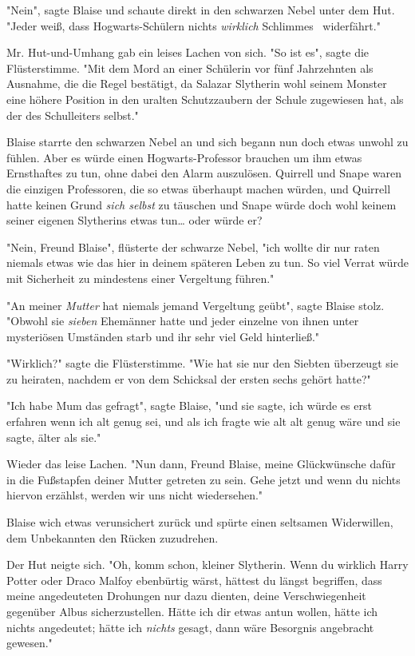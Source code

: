 {"Nein", sagte Blaise und schaute direkt in den schwarzen Nebel unter dem Hut. "Jeder weiß, dass Hogwarts-Schülern nichts \emph{wirklich} Schlimmes ~widerfährt."

Mr. Hut-und-Umhang gab ein leises Lachen von sich. "So ist es", sagte die Flüsterstimme. "Mit dem Mord an einer Schülerin vor fünf Jahrzehnten als Ausnahme, die die Regel bestätigt, da Salazar Slytherin wohl seinem Monster eine höhere Position in den uralten Schutzzaubern der Schule zugewiesen hat, als der des Schulleiters selbst."

Blaise starrte den schwarzen Nebel an und sich begann nun doch etwas unwohl zu fühlen. Aber es würde einen Hogwarts-Professor brauchen um ihm etwas Ernsthaftes zu tun, ohne dabei den Alarm auszulösen. Quirrell und Snape waren die einzigen Professoren, die so etwas überhaupt machen würden, und Quirrell hatte keinen Grund \emph{sich selbst} zu täuschen und Snape würde doch wohl keinem seiner eigenen Slytherins etwas tun… oder würde er?

"Nein, Freund Blaise", flüsterte der schwarze Nebel, "ich wollte dir nur raten niemals etwas wie das hier in deinem späteren Leben zu tun. So viel Verrat würde mit Sicherheit zu mindestens einer Vergeltung führen."

"An meiner \emph{Mutter} hat niemals jemand Vergeltung geübt", sagte Blaise stolz. "Obwohl sie \emph{sieben} Ehemänner hatte und jeder einzelne von ihnen unter mysteriösen Umständen starb und ihr sehr viel Geld hinterließ."

"Wirklich?" sagte die Flüsterstimme. "Wie hat sie nur den Siebten überzeugt sie zu heiraten, nachdem er von dem Schicksal der ersten sechs gehört hatte?"

"Ich habe Mum das gefragt", sagte Blaise, "und sie sagte, ich würde es erst erfahren wenn ich alt genug sei, und als ich fragte wie alt alt genug wäre und sie sagte, älter als sie."

Wieder das leise Lachen. "Nun dann, Freund Blaise, meine Glückwünsche dafür in die Fußstapfen deiner Mutter getreten zu sein. Gehe jetzt und wenn du nichts hiervon erzählst, werden wir uns nicht wiedersehen."

Blaise wich etwas verunsichert zurück und spürte einen seltsamen Widerwillen, dem Unbekannten den Rücken zuzudrehen.

Der Hut neigte sich. "Oh, komm schon, kleiner Slytherin. Wenn du wirklich Harry Potter oder Draco Malfoy ebenbürtig wärst, hättest du längst begriffen, dass meine angedeuteten Drohungen nur dazu dienten, deine Verschwiegenheit gegenüber Albus sicherzustellen. Hätte ich dir etwas antun wollen, hätte ich nichts angedeutet; hätte ich \emph{nichts} gesagt, dann wäre Besorgnis angebracht gewesen."

}
